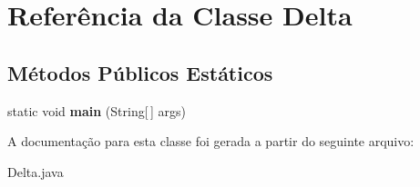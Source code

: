 \hypertarget{classDelta}{\section{Referência da Classe Delta}
\label{classDelta}
}
\subsection*{Métodos Públicos Estáticos}
\begin{DoxyCompactItemize}
\item 
\hypertarget{classDelta_a6ee55811491e4c5dc88158ac1e93788f}{static void {\bfseries main} (String\mbox{[}$\,$\mbox{]} args)}\label{classDelta_a6ee55811491e4c5dc88158ac1e93788f}

\end{DoxyCompactItemize}


A documentação para esta classe foi gerada a partir do seguinte arquivo\-:\begin{DoxyCompactItemize}
\item 
Delta.\-java\end{DoxyCompactItemize}
